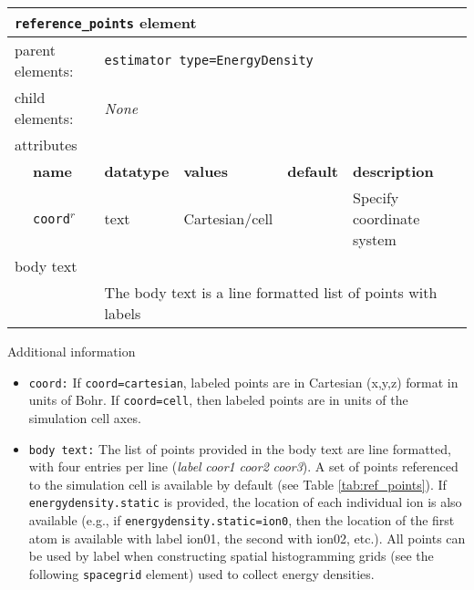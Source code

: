 \FloatBarrier
\begin{table}[h]
\begin{center}
\begin{tabularx}{\textwidth}{l l l l l X }
\hline
\multicolumn{6}{l}{\texttt{reference\_points} element} \\
\hline
\multicolumn{2}{l}{parent elements:} & \multicolumn{4}{l}{\texttt{estimator type=EnergyDensity}}\\
\multicolumn{2}{l}{child  elements:} & \multicolumn{4}{l}{\textit{None}}\\
\multicolumn{2}{l}{attributes}  & \multicolumn{4}{l}{}\\
   &   \bfseries name     & \bfseries datatype & \bfseries values & \bfseries default   & \bfseries description \\
   &   \texttt{coord}$^r$ &  text              & Cartesian/cell   &                     & Specify coordinate system \\
\multicolumn{2}{l}{body text}  & \multicolumn{4}{l}{}\\
   &                           & \multicolumn{4}{l}{The body text is a line formatted list of points with labels}     \\
  \hline
\end{tabularx}
\end{center}
\end{table}
\FloatBarrier

Additional information
\begin{itemize}
  \item{\texttt{coord:} If \texttt{coord=cartesian}, labeled points are in Cartesian (x,y,z) format in units of Bohr.  If \texttt{coord=cell}, then labeled points are in units of the simulation cell axes.}
  \item{\texttt{body text:}  The list of points provided in the body text are line formatted, with four entries per line (\textit{label} \textit{coor1} \textit{coor2} \textit{coor3}}).  A set of points referenced to the simulation cell is available by default (see Table \ref{tab:ref_points}).  If \texttt{energydensity.static} is provided, the location of each individual ion is also available (e.g., if \texttt{energydensity.static=ion0}, then the location of the first atom is available with label ion01, the second with ion02, etc.). All points can be used by label when constructing spatial histogramming grids (see the following \texttt{spacegrid} element) used to collect energy densities.    
\end{itemize}


